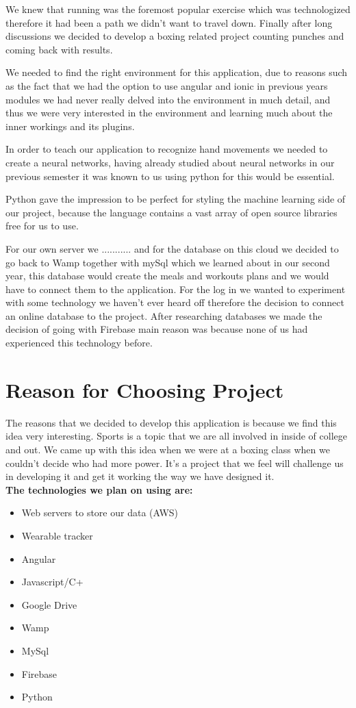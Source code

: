 \documentclass[a4paper,12pt,twoside]{report}
\begin{document}
We knew that running was the foremost popular exercise which was technologized therefore it had been a path we didn't want to travel down. Finally after long discussions we decided to develop a boxing related project counting punches and coming back with results.

We needed to find the right environment for this application, due to reasons such as the fact that we had the option to use angular and ionic in previous years modules we had never really delved into the environment in much detail, and thus we were very interested in the environment and learning much about the inner workings and its plugins.

In order to teach our application to recognize hand movements we needed to create a neural networks, having already studied about neural networks in our previous semester it was known to us using python for this would be essential.

Python gave the impression to be perfect for styling the machine learning side of
our project, because the language contains a vast array of open source libraries
free for us to use.

For our own server we ........... and for the database on this cloud we decided to go back to Wamp together with mySql which we learned about in  our second year, this database would create the meals and workouts plans and we would have to connect them to the application.
For the log in we wanted to experiment with some technology we haven't ever heard off therefore the decision to connect an online database to the project. After researching databases we made the decision of going with Firebase main reason was because none of us had experienced this technology before.

\section{Reason for Choosing Project}
The reasons that we decided to develop this application is because we find this idea very interesting. Sports is a topic that we are all involved in inside of college and out. We came up with this idea when we were at a boxing class when we couldn't decide who had more power. It’s a project that we feel will challenge us in developing it and get it working the way we have designed it.
\\
\textbf{The technologies we plan on using are:}
\begin{itemize}
\item{Web servers to store our data (AWS)}
\item{Wearable tracker}
\item{Angular}
\item{Javascript/C+}
\item{Google Drive}
\item{Wamp}
\item{MySql}
\item{Firebase}
\item{Python}
\end{itemize}
\end{document}
